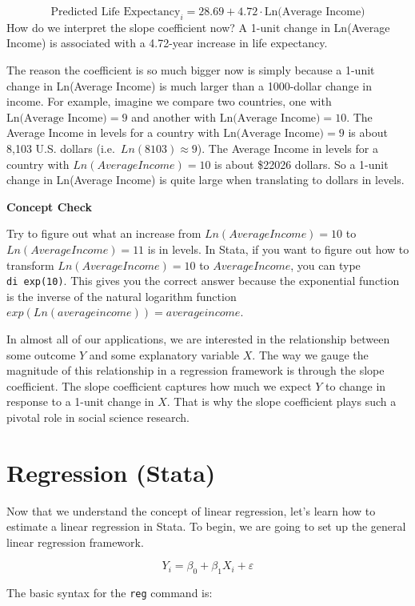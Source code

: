 \documentclass[
]{book}
\begin{document}
\[
\text{Predicted Life Expectancy}_i = 28.69 + 4.72 \cdot \text{Ln(Average Income)} 
\]
How do we interpret the slope coefficient now? A 1-unit change in Ln(Average Income) is associated with a 4.72-year increase in life expectancy.

The reason the coefficient is so much bigger now is simply because a 1-unit change in Ln(Average Income) is much larger than a 1000-dollar change in income. For example, imagine we compare two countries, one with \(\text{Ln(Average Income)}=9\) and another with \(\text{Ln(Average Income)}=10\). The Average Income in levels for a country with \(\text{Ln(Average Income)}=9\) is about 8,103 U.S. dollars (i.e.~\(Ln(8103) \approx 9\)). The Average Income in levels for a country with \(Ln(Average Income)=10\) is about \$22026 dollars. So a 1-unit change in Ln(Average Income) is quite large when translating to dollars in levels.

\textbf{Concept Check}

Try to figure out what an increase from \(Ln(Average Income)=10\) to \(Ln(Average Income)=11\) is in levels. In Stata, if you want to figure out how to transform \(Ln(Average Income)=10\) to \(Average Income\), you can type \texttt{di\ exp(10)}. This gives you the correct answer because the exponential function is the inverse of the natural logarithm function \(exp(Ln(average income))=average income\).

In almost all of our applications, we are interested in the relationship between some outcome \(Y\) and some explanatory variable \(X\). The way we gauge the magnitude of this relationship in a regression framework is through the slope coefficient. The slope coefficient captures how much we expect \(Y\) to change in response to a 1-unit change in \(X\). That is why the slope coefficient plays such a pivotal role in social science research.

\section{Regression (Stata)}\label{regression-stata}

Now that we understand the concept of linear regression, let's learn how to estimate a linear regression in Stata. To begin, we are going to set up the general linear regression framework.

\[ 
Y_i = \beta_0 + \beta_1 X_i + \varepsilon
\]

The basic syntax for the \texttt{reg} command is:
\end{document}
